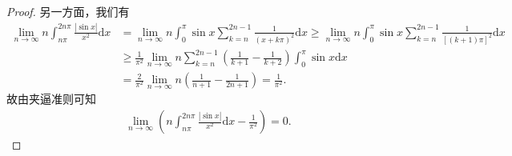 \documentclass[../../main.tex]{subfiles}%
\begin{document}
\begin{proof}
另一方面，我们有
\begin{align*}
\lim_{n \to \infty} n \int_{n\pi}^{2n\pi} \frac{|\sin x|}{x^2} \mathrm{d}x &= \lim_{n \to \infty} n \int_0^{\pi} \sin x \sum_{k=n}^{2n - 1} \frac{1}{(x + k\pi)^2} \mathrm{d}x \geqslant  \lim_{n \to \infty} n \int_0^{\pi} \sin x \sum_{k=n}^{2n - 1} \frac{1}{[(k + 1)\pi]^2} \mathrm{d}x 
\\
&\geqslant  \frac{1}{\pi^2} \lim_{n \to \infty} n \sum_{k=n}^{2n - 1} \left( \frac{1}{k + 1} - \frac{1}{k + 2} \right) \int_0^{\pi} \sin x \mathrm{d}x \\
&= \frac{2}{\pi^2} \lim_{n \to \infty} n \left( \frac{1}{n + 1} - \frac{1}{2n + 1} \right) = \frac{1}{\pi^2}.
\end{align*}
故由夹逼准则可知
\begin{align*}
\lim_{n \to \infty} \left( n \int_{n\pi}^{2n\pi} \frac{|\sin x|}{x^2} \mathrm{d}x - \frac{1}{\pi^2} \right) = 0.
\end{align*}

\end{proof}
\end{document}
